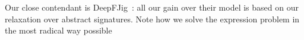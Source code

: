 Our close contendant is DeepFJig~\cite{corradi2011deepfjig}: all our gain over their model is based on our relaxation over abstract signatures.
Note how we solve the expression problem in the most radical way possible 




